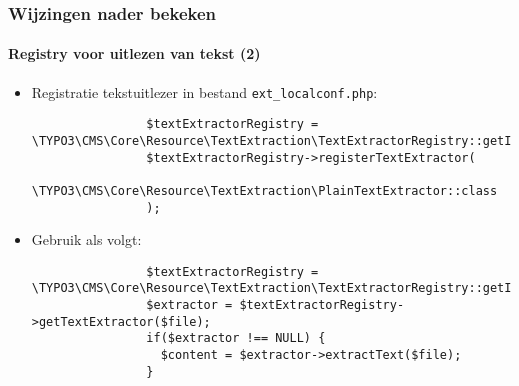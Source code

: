 \begin{frame}[fragile]
	\frametitle{Wijzingen nader bekeken}
	\framesubtitle{Registry voor uitlezen van tekst (2)}

	\lstset{basicstyle=\tiny\ttfamily}

	\begin{itemize}

		\item Registratie tekstuitlezer in bestand \texttt{ext\_localconf.php}:

			\begin{lstlisting}
				$textExtractorRegistry = \TYPO3\CMS\Core\Resource\TextExtraction\TextExtractorRegistry::getInstance();
				$textExtractorRegistry->registerTextExtractor(
				  \TYPO3\CMS\Core\Resource\TextExtraction\PlainTextExtractor::class
				);
			\end{lstlisting}

		\item Gebruik als volgt:

			\begin{lstlisting}
				$textExtractorRegistry = \TYPO3\CMS\Core\Resource\TextExtraction\TextExtractorRegistry::getInstance();
				$extractor = $textExtractorRegistry->getTextExtractor($file);
				if($extractor !== NULL) {
				  $content = $extractor->extractText($file);
				}
			\end{lstlisting}
	\end{itemize}

\end{frame}



